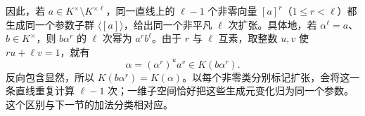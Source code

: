 因此，若 \(a\in K^\times\setminus K^{\times\ell}\)，同一直线上的 \(\ell-1\) 个非零向量 \([a]^r\)（\(1\le r<\ell\)）都生成同一个参数子群 \(\langle[a]\rangle\)，给出同一个非平凡 \(\ell\) 次扩张。具体地，若 \(\alpha^\ell=a\)、\(b\in K^\times\)，则 \(b\alpha^r\) 的 \(\ell\) 次幂为 \(a^r b^\ell\)。由于 \(r\) 与 \(\ell\) 互素，取整数 \(u,v\) 使 \(ru+\ell v=1\)，就有
\[
	\alpha=(\alpha^r)^u a^v\in K(b\alpha^r).
\]
反向包含显然，所以 \(K(b\alpha^r)=K(\alpha)\)。以每个非零类分别标记扩张，会将这一条直线重复计算 \(\ell-1\) 次；一维子空间恰好把这些生成元变化归为同一个参数。这个区别与下一节的加法分类相对应。
